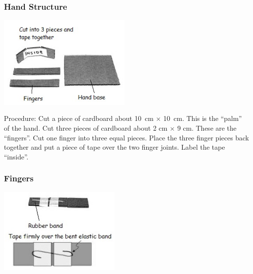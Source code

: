 \begin{multicols}{2}
\subsubsection{Hand Structure}

\begin{center}
\includegraphics[width=0.49\textwidth]{./img/robotic-hand-1.jpg}
\end{center}

\begin{description*}
\item[Procedure:]{Cut a piece of cardboard about 10~cm $\times$ 10~cm. This is the ``palm'' of the hand. Cut three pieces of cardboard about 2 cm $\times$ 9 cm. These are the ``fingers''. Cut one finger into three equal pieces. Place the three finger pieces back together and put a piece of tape over the two
finger joints. Label the tape ``inside''.}
\end{description*}

\columnbreak

\subsubsection{Fingers}

\begin{center}
\includegraphics[width=0.45\textwidth]{./img/robotic-hand-finger.jpg}
\end{center}


\end{multicols}
